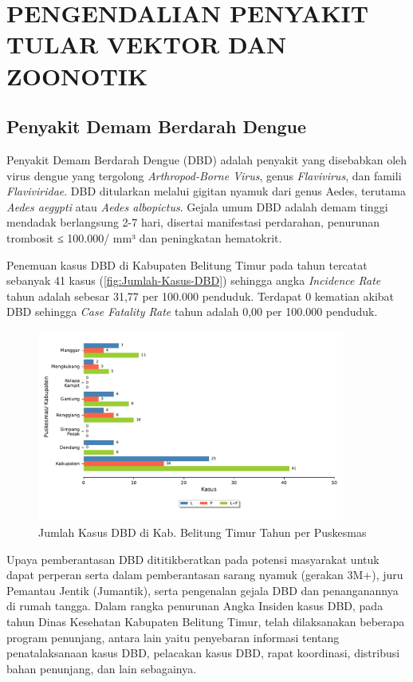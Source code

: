 \section[PENGENDALIAN PTVZ]{PENGENDALIAN PENYAKIT TULAR VEKTOR DAN ZOONOTIK}
\subsection{Penyakit Demam Berdarah Dengue}
Penyakit Demam Berdarah Dengue (DBD) adalah penyakit yang disebabkan oleh virus dengue yang tergolong \emph{Arthropod-Borne Virus}, genus \emph{Flavivirus}, dan famili \emph{Flaviviridae}.
DBD ditularkan melalui gigitan nyamuk dari genus Aedes, terutama \emph{Aedes aegypti} atau \emph{Aedes albopictus}.
Gejala umum DBD adalah demam tinggi mendadak berlangsung 2-7 hari, disertai manifestasi perdarahan, penurunan trombosit ≤ 100.000/ mm³ dan peningkatan hematokrit.

Penemuan kasus DBD di Kabupaten Belitung Timur pada tahun \tP tercatat sebanyak 41 kasus (\autoref{fig:Jumlah-Kasus-DBD}) sehingga angka \emph{Incidence Rate} tahun \tP adalah sebesar 31,77 per 100.000 penduduk.
Terdapat 0 kematian akibat DBD sehingga \emph{Case Fatality Rate} tahun \tP adalah 0,00 per 100.000 penduduk.

\begin{figure}[H]
  \centering
  \includegraphics[width=0.9\textwidth]{bab_06/bab_06_10_DBD}
  \caption{Jumlah Kasus DBD di Kab. Belitung Timur Tahun \tP per Puskesmas}
  \label{fig:Jumlah-Kasus-DBD}
\end{figure}

Upaya pemberantasan DBD dititikberatkan pada potensi masyarakat untuk dapat perperan serta dalam pemberantasan sarang nyamuk (gerakan 3M+), juru Pemantau Jentik (Jumantik), serta pengenalan gejala DBD dan penanganannya di rumah tangga.
Dalam rangka penurunan Angka Insiden kasus DBD, pada tahun \tP Dinas Kesehatan Kabupaten Belitung Timur, telah dilaksanakan beberapa program penunjang, antara lain yaitu penyebaran informasi tentang penatalaksanaan kasus DBD, pelacakan kasus DBD, rapat koordinasi, distribusi bahan penunjang, dan lain sebagainya.

